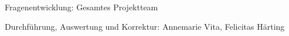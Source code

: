 Fragenentwicklung: Gesamtes Projektteam

Durchführung, Auswertung und Korrektur: Annemarie Vita, Felicitas
Härting
